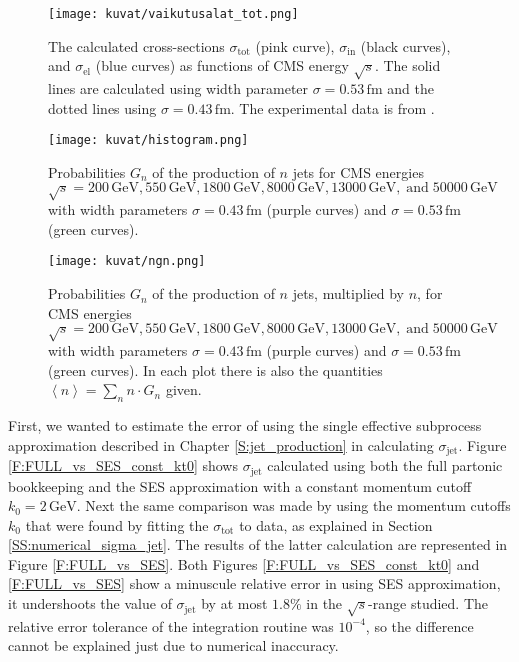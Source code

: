 \documentclass[a4paper, twoside, english, 12pt]{report}
\begin{document}
\begin{figure}[htb!]
	\centering
	\texttt{[image: kuvat/vaikutusalat\_tot.png]}
	\caption{The calculated cross-sections $\sigma_{\text{tot}}$ (pink curve), $\sigma_{\text{in}}$ (black curves), and $\sigma_{\text{el}}$ (blue curves) as functions of CMS energy $\sqrt{s}$. The solid lines are calculated using width parameter $\sigma = 0.53\,\text{fm}$ and the dotted lines using $\sigma = 0.43\,\text{fm}$. The experimental data is from  \cite{fit,data1,data2,data3,data4,data5}.}
	\label{F:all_sigmas}
\end{figure}

\begin{figure}[htb!]
	\centering
	\texttt{[image: kuvat/histogram.png]}
	\caption{Probabilities $G_n$ of the production of $n$ jets for CMS energies $\sqrt{s}=200\,\text{GeV}, 550\,\text{GeV}, 1800\,\text{GeV}, 8000\,\text{GeV}, 13000\,\text{GeV}, \;\text{and}\; 50000\,\text{GeV}$ with width parameters $\sigma = 0.43\,\text{fm}$ (purple curves) and $\sigma = 0.53\,\text{fm}$ (green curves).}
	\label{F:multiple_jets}
\end{figure}

\begin{figure}[htb!]
	\centering
	\texttt{[image: kuvat/ngn.png]}
	\caption{Probabilities $G_n$ of the production of $n$ jets, multiplied by $n$, for CMS energies $\sqrt{s}=200\,\text{GeV}, 550\,\text{GeV}, 1800\,\text{GeV}, 8000\,\text{GeV}, 13000\,\text{GeV}, \;\text{and}\; 50000\,\text{GeV}$ with width parameters $\sigma = 0.43\,\text{fm}$ (purple curves) and $\sigma = 0.53\,\text{fm}$ (green curves). In each plot there is also the quantities $\left\langle n \right\rangle = \sum\limits_n n\cdot G_n$ given.}
	\label{F:ngn}
\end{figure}

First, we wanted to estimate the error of using the single effective subprocess approximation described in Chapter \ref{S:jet_production} in calculating $\sigma_{\text{jet}}$. Figure \ref{F:FULL_vs_SES_const_kt0} shows $\sigma_{\text{jet}}$ calculated using both the full partonic bookkeeping and the SES approximation with a constant momentum cutoff $k_0=2\,\text{GeV}$. Next the same comparison was made by using the momentum cutoffs $k_0$ that were found by fitting the $\sigma_{\text{tot}}$ to data, as explained in Section \ref{SS:numerical_sigma_jet}. The results of the latter calculation are represented in Figure \ref{F:FULL_vs_SES}. Both Figures \ref{F:FULL_vs_SES_const_kt0} and \ref{F:FULL_vs_SES} show a minuscule relative error in using SES approximation, it undershoots the value of $\sigma_{\text{jet}}$ by at most $1.8\%$ in the $\sqrt{s}$-range studied. The relative error tolerance of the integration routine was $10^{-4}$, so the difference cannot be explained just due to numerical inaccuracy.
\end{document}
